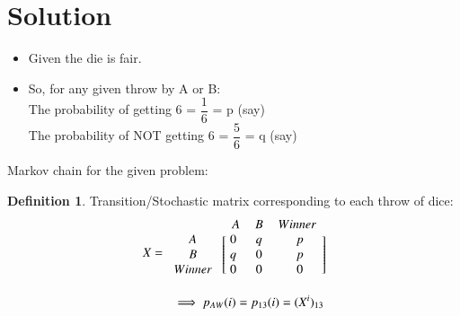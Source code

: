 \documentclass[journal,12pt,twocolumn]{IEEEtran}
\theoremstyle{definition}
\newtheorem{definition}{Definition}[section]
\numberwithin{equation}{subsection}
\begin{document}
\section{\Large Solution}
\begin{itemize}
    \item Given the die is fair.
    \item So, for any given throw by A or B:\\
    The probability of getting 6 = $\dfrac{1}{6}$ = p (say)\\
    The probability of NOT getting 6 = $\dfrac{5}{6}$ = q (say)
\end{itemize}
\begin{center}
    Markov chain for the given problem:\\
\end{center}
\begin{definition}
    Transition/Stochastic matrix corresponding to each throw of dice:
    \begin{align*}
        X = \begin{blockarray}{ *{4}{c} }
                & A & B & Winner \\
                \begin{block}{ c @{\quad} [ @{\,} *{3}{c} @{\,} ] }
                    A & 0 & q & p  \\
                    B & q & 0 & p\\
                Winner & 0 & 0 & 0  \\
                \end{block}
            \end{blockarray}\\
            \implies p_{AW}(i) = p_{13}(i) = (X^i)_{13} 
    \end{align*}
\end{definition}
\end{document}
